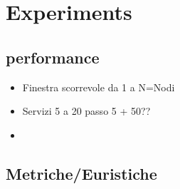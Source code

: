 \section{Experiments}\label{sec:experiment}
\subsection{performance}
\begin{itemize}
  \item Finestra scorrevole da 1 a N=Nodi
  \item Servizi 5 a 20 passo 5 + 50??
  \item
\end{itemize}
\subsection{Metriche/Euristiche}